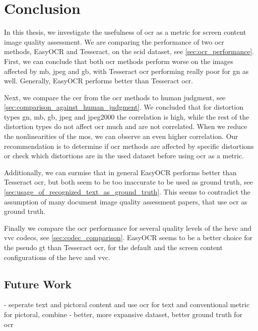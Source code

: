 \chapter{Conclusion}
\label{chap:conclusion}

In this thesis, we investigate the usefulness of \gls{ocr} as a metric for screen content image quality assessment.
We are comparing the performance of two \gls{ocr} methods, EasyOCR and Tesseract, on the \gls{scid} dataset, see \autoref{sec:ocr_performance}.
First, we can conclude that both \gls{ocr} methods perform worse on the images affected by \gls{mb}, \gls{jpeg} and \gls{gb}, with Tesseract \gls{ocr} performing really poor for \gls{gn} as well.
Generally, EasyOCR performs better than Tesseract \gls{ocr}.

Next, we compare the \gls{cer} from the \gls{ocr} methods to human judgment, see \autoref{sec:comparison_against_human_judgment}.
We concluded that for distortion types \gls{gn}, \gls{mb}, \gls{gb}, \gls{jpeg} and \gls{jpeg2000} the correlation is high, while the rest of the distortion types do not affect \gls{ocr} much and are not correlated.
When we reduce the nonlinearities of the \gls{mos}, we can observe an even higher correlation.
Our recommendation is to determine if \gls{ocr} methods are affected by specific distortions or check which distortions are in the used dataset before using \gls{ocr} as a metric.

Additionally, we can surmise that in general EasyOCR performs better than Tesseract \gls{ocr}, but both seem to be too inaccurate to be used as ground truth, see \autoref{sec:usage_of_recognized_text_as_ground_truth}.
This seems to contradict the assumption of many document image quality assessment papers, that use \gls{ocr} as ground truth.

Finally we compare the \gls{ocr} performance for several quality levels of the \gls{hevc} and \gls{vvc} codecs, see \autoref{sec:codec_comparison}.
EasyOCR seems to be a better choice for the pseudo \gls{gt} than Tesseract \gls{ocr}, for the default and the screen content configurations of the \gls{hevc} and \gls{vvc}.


\section{Future Work}
\label{sec:future}

- seperate text and pictoral content and use ocr for text and conventional metric for pictoral, combine
- better, more expansive dataset, better ground truth for ocr

